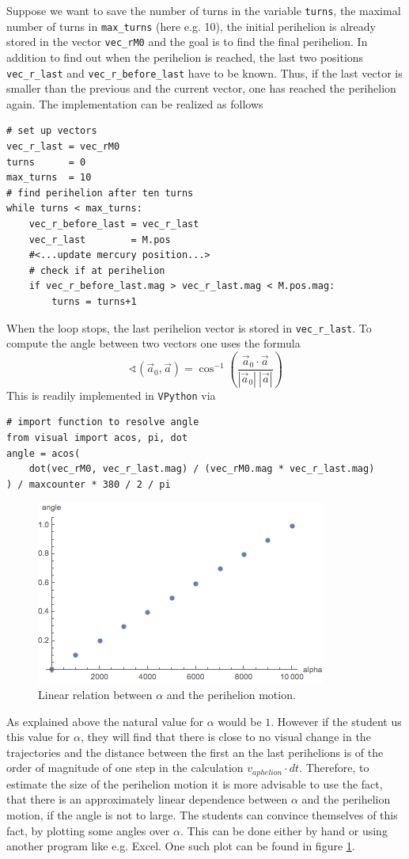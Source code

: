 \documentclass[12pt]{iopart}
\begin{document}
Suppose we want to save the number of turns in the variable \texttt{turns}, the maximal number of turns in \texttt{max\_turns} (here e.g. 10), the initial perihelion is already stored in the vector \texttt{vec\_rM0} and the goal is to find the final perihelion.
In addition to find out when the perihelion is reached, the last two positions \texttt{vec\_r\_last} and \texttt{vec\_r\_before\_last} have to be known.
Thus, if the last vector is smaller than the previous and the current vector, one has reached the perihelion again.
The implementation can be realized as follows
\begin{lstlisting}
# set up vectors
vec_r_last = vec_rM0
turns      = 0
max_turns  = 10
# find perihelion after ten turns
while turns < max_turns:
	vec_r_before_last = vec_r_last
	vec_r_last        = M.pos
	#<...update mercury position...>
	# check if at perihelion
	if vec_r_before_last.mag > vec_r_last.mag < M.pos.mag:
		turns = turns+1
\end{lstlisting}
When the loop stops, the last perihelion vector is stored in  \texttt{vec\_r\_last}.
To compute the angle between two vectors one uses the formula
 \begin{equation}
 	\sphericalangle(\vec{a}_0,\vec{a}) = \cos^{-1} \left( \frac{\vec{a}_0 \cdot \vec{a}}{|\vec{a}_0|\:|\vec{a}|} \right)
 \end{equation}
This is readily implemented in \texttt{VPython} via
\begin{lstlisting}
# import function to resolve angle
from visual import acos, pi, dot
angle = acos(
	dot(vec_rM0, vec_r_last.mag) / (vec_rM0.mag * vec_r_last.mag)
) / maxcounter * 380 / 2 / pi
\end{lstlisting}

\begin{figure}[htb]
	\centering
	\includegraphics[width=.5\textwidth]{figs/AlphaAngle.png}
	\caption{\label{fig:AlphaAngle} Linear relation between $\alpha$ and the perihelion motion.}
\end{figure}

As explained above the natural value for $\alpha$ would be $1$.
However if the student us this value for $\alpha$, they will find that there is close to no visual change in the trajectories and the distance between the first an the last perihelions is of the order of magnitude of one step in the calculation $v_{aphelion}\cdot dt$.
Therefore, to estimate the size of the perihelion motion it is more advisable to use the fact, that there is an approximately linear dependence between $\alpha$ and the perihelion motion, if the angle is not to large.
The students can convince themselves of this fact, by plotting some angles over $\alpha$.
This can be done either by hand or using another program like e.g. Excel.
One such plot can be found in figure \ref{fig:AlphaAngle}.
\end{document}
